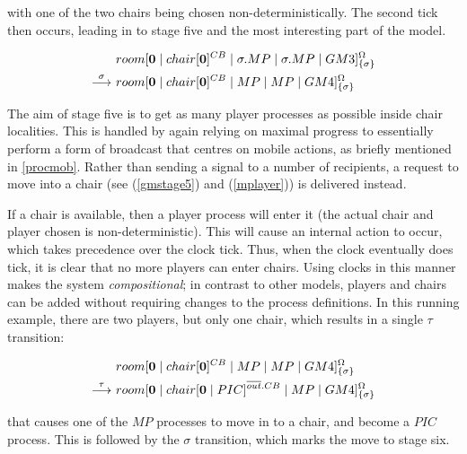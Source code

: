 \noindent with one of the two chairs being chosen non-deterministically.
The second tick then occurs, leading in to stage five and the most
interesting part of the model.

\begin{equation}
\begin{aligned}
& {room}[ \textbf{0} \;|\; {chair}[ \textbf{0} ]^{CB} \;|\; 
   \sigma.MP \;|\; \sigma.MP \;|\;
   GM3 ]^{\Omega}_{\{\sigma\}} \\
\stackrel{\sigma}{\longrightarrow}\ & {room}[ \textbf{0} \;|\; {chair}[ \textbf{0} ]^{CB} \;|\; 
   MP \;|\; MP \;|\;
   GM4 ]^{\Omega}_{\{\sigma\}} \\
\end{aligned}
\end{equation}

The aim of stage five is to get as many player processes as possible
inside chair localities.  This is handled by again relying on maximal
progress to essentially perform a form of broadcast that centres on
mobile actions, as briefly mentioned in \ref{procmob}.  Rather than
sending a signal to a number of recipients, a request to move into a
chair (see (\ref{gmstage5}) and (\ref{mplayer})) is delivered instead.

If a chair is available, then a player process will enter it (the actual
chair and player chosen is non-deterministic).  This will cause an
internal action to occur, which takes precedence over the clock tick.
Thus, when the clock eventually does tick, it is clear that no more
players can enter chairs. Using clocks in this manner makes the system
\emph{compositional}; in contrast to other models, players and chairs
can be added without requiring changes to the process definitions.  In
this running example, there are two players, but only one chair, which
results in a single $\tau$ transition:

\begin{equation}
\begin{aligned}
& {room}[ \textbf{0} \;|\; {chair}[ \textbf{0} ]^{CB} \;|\; 
   MP \;|\; MP \;|\;
   GM4 ]^{\Omega}_{\{\sigma\}} \\
\stackrel{\tau}{\longrightarrow}\ & {room}[ \textbf{0} \;|\; {chair}[ \textbf{0} \;|\; PIC ]^{\overline{out}.CB} \;|\; 
   MP \;|\;
   GM4 ]^{\Omega}_{\{\sigma\}} \\
\end{aligned}
\end{equation}

\noindent that causes one of the $MP$ processes to move in to a
chair, and become a $PIC$ process.  This is followed by the
$\sigma$ transition, which marks the move to stage six.

